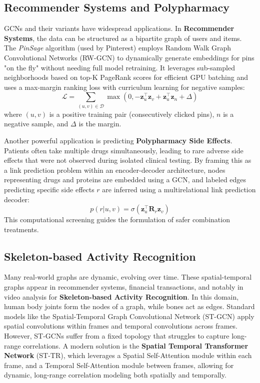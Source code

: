 \subsection{Recommender Systems and Polypharmacy}
GCNs and their variants have widespread applications. In \textbf{Recommender Systems}, the data can be structured as a bipartite graph of users and items. The \textit{PinSage} algorithm (used by Pinterest) employs Random Walk Graph Convolutional Networks (RW-GCN) to dynamically generate embeddings for pins "on the fly" without needing full model retraining. It leverages sub-sampled neighborhoods based on top-K PageRank scores for efficient GPU batching and uses a max-margin ranking loss with curriculum learning for negative samples:
\begin{equation}
    \mathcal{L} = \sum_{(u,v) \in \mathcal{D}} \max(0, - \mathbf{z}_u^\top \mathbf{z}_v + \mathbf{z}_u^\top \mathbf{z}_n + \Delta)
\end{equation}
where $(u,v)$ is a positive training pair (consecutively clicked pins), $n$ is a negative sample, and $\Delta$ is the margin.

Another powerful application is predicting \textbf{Polypharmacy Side Effects}. Patients often take multiple drugs simultaneously, leading to rare adverse side effects that were not observed during isolated clinical testing. By framing this as a link prediction problem within an encoder-decoder architecture, nodes representing drugs and proteins are embedded using a GCN, and labeled edges predicting specific side effects $r$ are inferred using a multirelational link prediction decoder:
\begin{equation}
    p(r | u, v) = \sigma( \mathbf{z}_u^\top \mathbf{R}_r \mathbf{z}_v )
\end{equation}
This computational screening guides the formulation of safer combination treatments.

\subsection{Skeleton-based Activity Recognition}
Many real-world graphs are dynamic, evolving over time. These spatial-temporal graphs appear in recommender systems, financial transactions, and notably in video analysis for \textbf{Skeleton-based Activity Recognition}. 
In this domain, human body joints form the nodes of a graph, while bones act as edges. Standard models like the Spatial-Temporal Graph Convolutional Network (ST-GCN) apply spatial convolutions within frames and temporal convolutions across frames. 
However, ST-GCNs suffer from a fixed topology that struggles to capture long-range correlations. A modern solution is the \textbf{Spatial Temporal Transformer Network} (ST-TR), which leverages a Spatial Self-Attention module within each frame, and a Temporal Self-Attention module between frames, allowing for dynamic, long-range correlation modeling both spatially and temporally.

